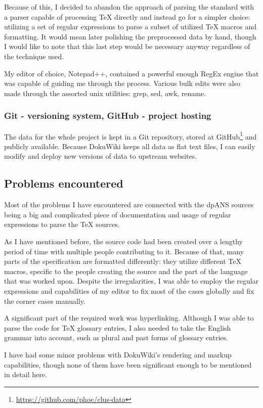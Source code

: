 Because of this, I decided to abandon the approach of parsing the standard with a parser capable of processing \TeX{} directly and instead go for a simpler choice: utilizing a set of regular expressions to parse a subset of utilized \TeX{} macros and formatting. It would mean later polishing the preprocessed data by hand, though I would like to note that this last step would be necessary anyway regardless of the technique used.

My editor of choice, Notepad++, contained a powerful enough RegEx engine that was capable of guiding me through the process. Various bulk edits were also made through the assorted unix utilities: grep, sed, awk, rename.

\subsubsection{Git - versioning system, GitHub - project hosting}

The data for the whole project is kept in a Git repository, stored at GitHub\footnote{\url{https://github.com/phoe/clus-data}} and publicly available. Because DokuWiki keeps all data as flat text files, I can easily modify and deploy new versions of data to upstream websites.

\subsection{Problems encountered}

Most of the problems I have encountered are connected with the dpANS sources being a big and complicated piece of documentation and usage of regular expressions to parse the \TeX{} sources.

As I have mentioned before, the source code had been created over a lengthy period of time with multiple people contributing to it. Because of that, many parts of the specification are formatted differently: they utilize different \TeX{} macros, specific to the people creating the source and the part of the language that was worked upon. Despite the irregularities, I was able to employ the regular expressions and capabilities of my editor to fix most of the cases globally and fix the corner cases manually.

A significant part of the required work was hyperlinking. Although I was able to parse the code for \TeX{} glossary entries, I also needed to take the English grammar into account, such as plural and past forms of glossary entries.

I have had some minor problems with DokuWiki's rendering and markup capabilities, though none of them have been significant enough to be mentioned in detail here.
